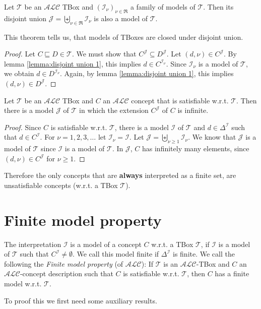 \begin{theorem}
	Let $\mathcal{T}$ be an $\mathcal{ALC}$ TBox and $(\mathcal{I}_\nu)_{\nu \in \mathfrak{R}}$ a family of models of $\mathcal{T}$.
	Then its disjoint union $\mathcal{J} = \biguplus_{\nu \in \mathfrak{R}} \mathcal{I}_\nu$ is also a model of $\mathcal{T}$.
\end{theorem}
This theorem tells us, that models of TBoxes are closed under disjoint union.
\begin{proof}
	Let $C \sqsubseteq D \in \mathcal{T}$.
	We must show that $C^{\mathcal{J}} \subseteq D^{\mathcal{J}}$.
	Let $\left( d,\nu \right) \in C^{\mathcal{J}}$.
	By lemma \ref{lemma:disjoint union 1}, this implies $d \in C^{\mathcal{I}_\nu}$.
	Since $\mathcal{I}_\nu$ is a model of $\mathcal{T}$, we obtain $d \in D^{\mathcal{I}_\nu}$.
	Again, by lemma \ref{lemma:disjoint union 1}, this implies $(d,\nu) \in D^{\mathcal{J}}$.
\end{proof}

\begin{corollary}
 	Let $\mathcal{T}$ be an $\mathcal{ALC}$ TBox and $C$ an $\mathcal{ALC}$ concept that is satisfiable w.r.t. $\mathcal{T}$.
	Then there is a model $\mathcal{J}$ of $\mathcal{T}$ in which the extension $C^{\mathcal{J}}$ of $C$ is infinite.
\end{corollary}
\begin{proof}
	Since $C$ is satisfiable w.r.t. $\mathcal{T}$, there is a model $\mathcal{I}$ of $\mathcal{T}$ and $d \in \Delta^{\mathcal{I}}$ such that $d \in C^{\mathcal{I}}$.
	For $\nu = 1,2,3,\ldots$ let $\mathcal{I}_\nu = \mathcal{I}$.
	Let $\mathcal{J} = \biguplus_{\nu \geq 1} \mathcal{I}_\nu$.
	We know that $\mathcal{J}$ is a model of $\mathcal{T}$ since $\mathcal{I}$ is a model of $\mathcal{T}$.
	In $\mathcal{J}$, $C$ has infinitely many elements, since $(d,\nu) \in C^{\mathcal{J}}$ for $\nu \geq 1$.
\end{proof}
Therefore the only concepts that are \textbf{always} interpreted as a finite set,
are unsatisfiable concepts (w.r.t. a TBox $\mathcal{T}$).

\section{Finite model property}
\begin{definition}
	The interpretation $\mathcal{I}$ is a model of a concept $C$ w.r.t. a TBox $\mathcal{T}$,
	if $\mathcal{I}$ is a model of $\mathcal{T}$ such that $C^{\mathcal{I}} \neq \emptyset$.
	We call this model finite if $\Delta^{\mathcal{I}}$ is finite.
	\newline
	We call the following the \textit{Finite model property} (of $\mathcal{ALC}$):
	\newline
	If $\mathcal{T}$ is an $\mathcal{ALC}$-TBox and $C$ an $\mathcal{ALC}$-concept description 
	such that $C$ is satisfiable w.r.t. $\mathcal{T}$,
	then $C$ has a finite model w.r.t. $\mathcal{T}$.
\end{definition}	
To proof this we first need some auxiliary results.

